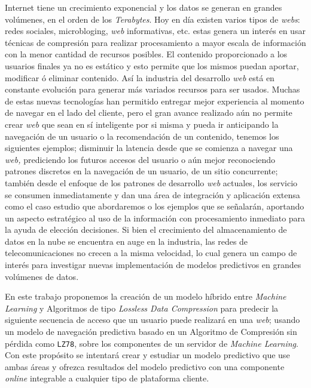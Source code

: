 
Internet tiene un crecimiento exponencial  y los datos se generan en grandes volúmenes, en el orden de los \emph{Terabytes}. Hoy en día existen varios tipos de \emph{webs}: redes sociales, microbloging, \emph{web} informativas, etc. estas genera un interés en usar técnicas de compresión para realizar procesamiento a mayor escala de información con la menor cantidad de recursos posibles. El contenido proporcionado a los usuarios finales ya no es estático y esto permite que los mismos puedan  aportar, modificar ó eliminar contenido. Así  la industria del desarrollo \emph{web} está en constante evolución para generar más variados recursos para ser usados. Muchas de estas nuevas tecnologías han permitido entregar mejor experiencia al momento de navegar en el lado del cliente, pero el gran avance realizado aún no permite crear \emph{web} que sean en sí inteligente por si misma y pueda ir anticipando la  navegación de un usuario o la recomendación de un contenido, tenemos los siguientes ejemplos; disminuir la latencia desde que se comienza a navegar una \emph{web,} prediciendo los futuros accesos del usuario o aún mejor reconociendo patrones discretos en la navegación de un usuario,  de un sitio concurrente; también desde el enfoque de los patrones de desarrollo \emph{web} actuales, los servicio  se consumen inmediatamente y dan una área de integración y  aplicación extensa como el caso estudio que abordaremos o los ejemplos que se señalarán, aportando un aspecto estratégico al uso de la información con procesamiento inmediato para la ayuda de elección decisiones.
Si bien el crecimiento del almacenamiento de datos en la nube se encuentra en auge en la industria, las redes de telecomunicaciones  no crecen a la misma velocidad, lo cual genera un campo de interés para investigar nuevas implementación de modelos predictivos en grandes volúmenes de datos. 

En este trabajo proponemos  la creación de un modelo híbrido entre \emph{Machine Learning} y Algoritmos de tipo \emph{Lossless Data Compression} para predecir la siguiente secuencia de acceso que un usuario puede realizará en una \emph{web}; usando un modelo de navegación predictiva basado en un Algoritmo de Compresión sin pérdida como \texttt{LZ78}, sobre los componentes de un servidor de \emph{Machine Learning}. Con este propósito se intentará crear y estudiar un modelo predictivo que use ambas áreas y  ofrezca resultados del modelo predictivo con una componente \emph{online} integrable a cualquier tipo de plataforma cliente.
